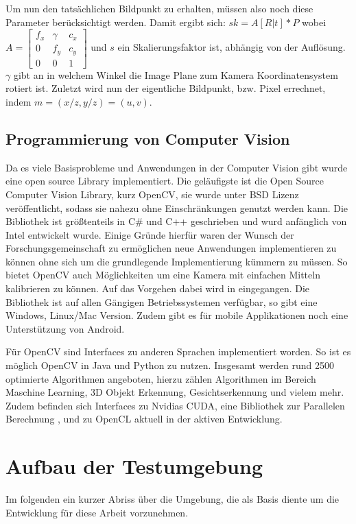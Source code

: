 Um nun den tatsächlichen Bildpunkt zu erhalten, müssen also noch diese Parameter berücksichtigt werden. Damit ergibt sich:
$sk = A [R | t] * P 
$
wobei $A = \begin{bmatrix} f_x & \gamma & c_x \\
                             0 &  f_y   & c_y \\
                             0 &  0     &  1\end{bmatrix}$ und $s$ ein Skalierungsfaktor ist, abhängig von der Auflösung. $\gamma$ gibt an in welchem Winkel die Image Plane zum Kamera Koordinatensystem rotiert ist. Zuletzt wird nun der eigentliche Bildpunkt, bzw. Pixel errechnet, indem $m=(x/z, y/z)=(u,v)$.



\subsection{Programmierung von Computer Vision}
Da es viele Basisprobleme und Anwendungen in der Computer Vision gibt wurde eine open source Library implementiert. Die geläufigste ist die Open Source Computer Vision Library, kurz OpenCV, sie wurde unter BSD Lizenz veröffentlicht, sodass sie nahezu ohne Einschränkungen genutzt werden kann. Die Bibliothek ist größtenteils in C\# und C++  geschrieben und wurd anfänglich von Intel entwickelt wurde. \textbf{\autocite[512--]{Medioni:2004:ETC:993884} }Einige Gründe hierfür waren der Wunsch der Forschungsgemeinschaft zu ermöglichen neue Anwendungen implementieren zu können ohne sich um die grundlegende Implementierung kümmern zu müssen. So bietet OpenCV auch Möglichkeiten um eine Kamera mit einfachen Mitteln kalibrieren zu können. Auf das Vorgehen dabei wird in  eingegangen.
Die Bibliothek ist auf allen Gängigen Betriebssystemen verfügbar, so gibt eine Windows, Linux/Mac Version. Zudem gibt es für mobile Applikationen noch eine Unterstützung von Android.

Für OpenCV sind Interfaces zu anderen Sprachen implementiert worden. So ist es möglich OpenCV in Java und Python zu nutzen. \autocite{OpenCV2016} Insgesamt werden rund 2500 optimierte Algorithmen angeboten, hierzu zählen Algorithmen im Bereich Maschine Learning, 3D Objekt Erkennung, Gesichtserkennung und vielem mehr. Zudem befinden sich Interfaces zu Nvidias CUDA, eine Bibliothek zur Parallelen Berechnung \autocite{cuda2017}, und zu OpenCL aktuell in der aktiven Entwicklung.


\section{Aufbau der Testumgebung}
\label{sec:setup}
Im folgenden ein kurzer Abriss über die Umgebung, die als Basis diente um die Entwicklung für diese Arbeit vorzunehmen. 



